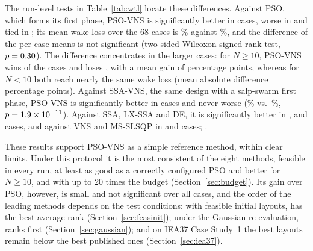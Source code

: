 The run-level tests in Table~\ref{tab:wtl} locate these differences. Against PSO, which forms its first phase, PSO-VNS is significantly better in \NWtlPSOW{} cases, worse in \NWtlPSOL{} and tied in \NWtlPSOT; its mean wake loss over the 68 cases is \NLossPSOVNS\% against \NLossPSO\%, and the difference of the per-case means is not significant (two-sided Wilcoxon signed-rank test, $p=0.30$). The difference concentrates in the larger cases: for $N\ge10$, PSO-VNS wins \NWtlPSOLargeW{} of the \NNLarge{} cases and loses \NWtlPSOLargeL, with a mean gain of \NGainPSOLarge{} percentage points, whereas for $N<10$ both reach nearly the same wake loss (mean absolute difference \NAbsDiffPSOSmall{} percentage points). Against SSA-VNS, the same design with a salp-swarm first phase, PSO-VNS is significantly better in \NWtlSSAVNSW{} cases and never worse (\NLossPSOVNS\% vs.\ \NLossSSAVNS\%, $p=1.9\times10^{-11}$). Against SSA, LX-SSA and DE, it is significantly better in \NWtlSSAW, \NWtlLXSSAW{} and \NWtlDEW{} cases, and against VNS and MS-SLSQP in \NWtlVNSW{} and \NWtlSLSQPW{} cases; \NLossesPhrase.

These results support PSO-VNS as a simple reference method, within clear limits. Under this protocol it is the most consistent of the eight methods, feasible in every run, at least as good as a correctly configured PSO and better for $N\ge10$, and with up to 20 times the budget \NBudgetPhrase{} (Section~\ref{sec:budget}). Its gain over PSO, however, is small and not significant over all cases, and the order of the leading methods depends on the test conditions: with feasible initial layouts, \NFbFeasBestRank{} has the best average rank (Section~\ref{sec:feasinit}); under the Gaussian re-evaluation, \NBestGauss{} ranks first (Section~\ref{sec:gaussian}); and on IEA37 Case Study~1 the best layouts remain below the best published ones (Section~\ref{sec:iea37}).


